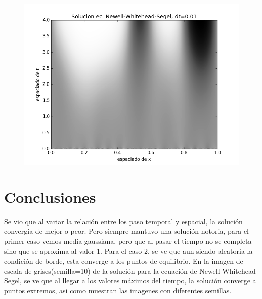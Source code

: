 \documentclass[10pt]{article}
\begin{document}
\begin{figure}[H]
\centering
\includegraphics[scale=0.35]{figure_p2_0.png}

\end{figure}



\section{Conclusiones}
 Se vio que al variar la relación entre los paso temporal y espacial, la solución convergia de mejor o peor. Pero siempre mantuvo una solución notoria, para el primer caso vemos media gaussiana, pero que al pasar el tiempo no se completa sino que se aproxima al valor 1. 
 Para el caso 2, se ve que aun siendo aleatoria la condición de borde, esta converge a los puntos de equilibrio.  En la imagen de escala de grises(semilla=10) de la solución para la ecuación de Newell-Whitehead-Segel, se ve que al llegar a los valores máximos del tiempo, la solución converge a puntos extremos, asi como muestran las imagenes con diferentes semillas.
\end{document}
